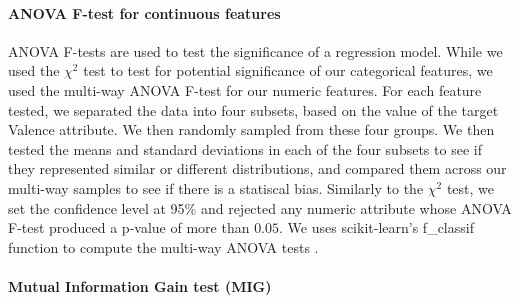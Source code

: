 \paragraph{ANOVA F-test for continuous features} 
ANOVA F-tests are used to test the significance of a regression model\cite{anova}.
While we used the $\chi^2$ test to test for potential significance of our 
categorical features, we used the multi-way ANOVA F-test for our numeric features.
For each feature tested, we separated the data into four subsets, based on the 
value of the target {Valence} attribute. We then randomly sampled from these four groups. We then tested the means and standard
deviations in each of the four subsets to see if they represented similar or
different distributions, and compared them across our multi-way samples to see if there is a statiscal bias. Similarly to the $\chi^2$ test, we set the 
confidence level at 95\% and rejected any numeric attribute whose ANOVA F-test
produced a p-value of more than $0.05$.  We uses 
scikit-learn's \textsf{f\_classif} function to 
compute the multi-way ANOVA tests \cite{scikit-learn}. 



\paragraph{Mutual Information Gain test (MIG)}

